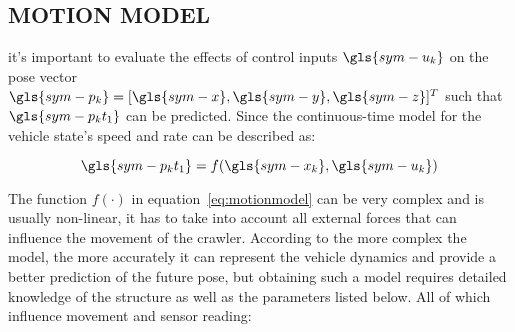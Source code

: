 \subsection{MOTION MODEL}\label{sec:motion model}

it's important to evaluate the effects of control inputs \( \gls{sym-u_k} \) on the pose vector \( \gls{sym-p_k} =
[\gls{sym-x}, \gls{sym-y}, \gls{sym-z}]^T \) such that \( \gls{sym-p_kt_1} \) can be predicted. Since the
continuous-time model for the vehicle state's speed and rate can be described as:

\begin{equation}
    \label{eq:motionmodel}
    \gls{sym-p_kt_1} = f(\gls{sym-x_k},\gls{sym-u_k})
\end{equation}

The function \( f(\cdot) \) in equation~\ref{eq:motionmodel} can be very complex and is usually non-linear, it has to
take
into account all external forces that can influence the movement of the crawler. According to
\citet{bahr_cooperative_2009} the more complex the model, the more accurately it can represent the vehicle dynamics and
provide a better prediction of the future pose, but obtaining such a model requires detailed knowledge of the structure
as well as the parameters listed below. All of which influence movement and sensor reading:
